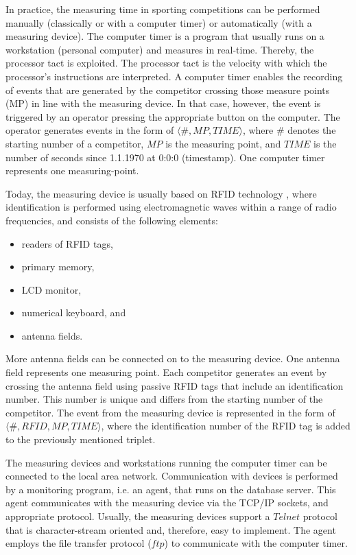 \documentclass[preprint, prX]{revtex4}
\begin{document}
In practice, the measuring time in sporting competitions can be performed manually (classically or with a computer timer) or automatically (with a measuring device). The computer timer is a program that usually runs on a workstation (personal computer) and measures in real-time. Thereby, the processor tact is exploited. The processor tact is the velocity with which the processor's instructions are interpreted. A computer timer enables the recording of events that are generated by the competitor crossing those measure points (MP) in line with the measuring device. In that case, however, the event is triggered by an operator pressing the appropriate button on the computer. The operator generates events in the form of $\langle\#,MP,TIME\rangle$, where $\#$ denotes the starting number of a competitor, $MP$ is the measuring point, and $TIME$ is the number of seconds since 1.1.1970 at 0:0:0 (timestamp). One computer timer represents one measuring-point.

Today, the measuring device is usually based on RFID technology \cite{Finkenzeller:2010}, where
identification is performed using electromagnetic waves within a range of radio frequencies, and consists of the following elements:
\begin{itemize}
  \item readers of RFID tags,
  \item primary memory,
  \item LCD monitor,
  \item numerical keyboard, and
  \item antenna fields.
\end{itemize}
More antenna fields can be connected on to the measuring device. One antenna field represents one measuring point. Each competitor
generates an event by crossing the antenna field using passive RFID tags that include an identification number. This number is unique and differs from the starting number of the competitor. The event from the measuring device is represented in the form of
$\langle\#,RFID,MP,TIME\rangle$, where the identification number of the RFID tag is added to the previously mentioned triplet.

The measuring devices and workstations running the computer timer can be connected to the local area network. Communication with devices is performed by a monitoring program, i.e. an agent, that runs on the database server. This agent communicates with the measuring device via the TCP/IP sockets, and appropriate protocol. Usually, the measuring devices support a $Telnet$ protocol that is character-stream
oriented and, therefore, easy to implement. The agent employs the file transfer protocol ($ftp$) to communicate with the computer timer.
\end{document}
